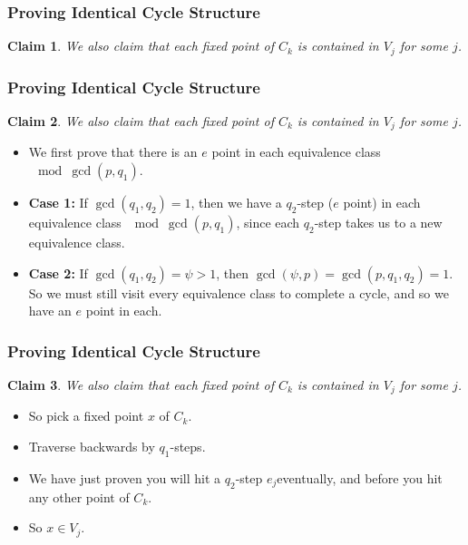 \documentclass{beamer}
\theoremstyle{plain}
\newtheorem*{Claim}{Claim}
\theoremstyle{definition}
\theoremstyle{remark}
\renewcommand{\'}{\hspace{0.5mm}'}		%
\begin{document}
\begin{frame}
\frametitle{Proving Identical Cycle Structure}
	
	\begin{Claim}
		We also claim that each fixed point of $C_k$
		is contained in $V_j$ for some $j$. 
	\end{Claim}
	

\end{frame}


\begin{frame}
\frametitle{Proving Identical Cycle Structure}
	
	\begin{Claim}
		We also claim that each fixed point of $C_k$
		is contained in $V_j$ for some $j$. 
	\end{Claim}
	\begin{itemize}
		\item We first prove that there is an $e$ point in each
	equivalence class $\mod \gcd(p,q_1)$. 
		\item \textbf{Case 1:}
		If $\gcd(q_1,q_2) = 1$, then we have a $q_2$-step
	($e$ point) in each equivalence class $\mod \gcd(p,q_1)$, 
	since each $q_2$-step takes us to a new equivalence class. 
		\item \textbf{Case 2:} If 
		$\gcd(q_1,q_2) = \psi > 1$, then 
		$\gcd(\psi,p) = \gcd(p,q_1,q_2) = 1$. So we must still
		visit every equivalence class to complete a cycle, and 
		so we have an $e$ point in each. 
	\end{itemize}

\end{frame}


\begin{frame}
\frametitle{Proving Identical Cycle Structure}
	
	\begin{Claim}
		We also claim that each fixed point of $C_k$
		is contained in $V_j$ for some $j$. 
	\end{Claim}
	\begin{itemize}
		\item So pick a fixed point $x$ of $C_k$. 
		\item Traverse backwards by $q_1$-steps. 
		\item We have just proven you will hit a $q_2$-step
		$e_j$eventually, and before you hit any other point of $C_k$.  
		\item So $x \in V_j$. 
	\end{itemize}

\end{frame}
\end{document}
